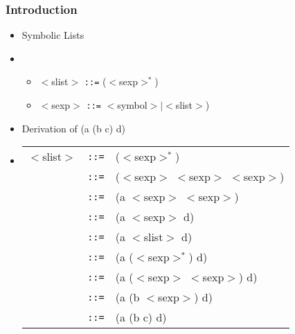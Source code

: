 \documentclass{beamer}
\newcommand{\is}{\texttt{::=}}
\begin{document}
\begin{frame}[fragile]
\frametitle{Introduction}
\begin{scriptsize}
\begin{itemize}
\item<1-> Symbolic Lists

\item<1->
\begin{itemize}
    \item $<$slist$>$ \is{} ($<$sexp$>^*$) \newline
    \item $<$sexp$>$ \is{} $<$symbol$> | <$slist$>$)
\end{itemize}

\item<2-> Derivation of (a (b c) d)

\item<2->
  \begin{tabular}{lll}
    $<$slist$>$ & \is{} & ($<$sexp$>^*$) \\
     & \is{} & ($<$sexp$>$ $<$sexp$>$ $<$sexp$>$) \\
     & \is{} & (a  $<$sexp$>$ $<$sexp$>$) \\
     & \is{} & (a $<$sexp$>$ d) \\
     & \is{} & (a $<$slist$>$ d) \\
     & \is{} & (a ($<$sexp$>^*$) d)\\
     & \is{} & (a ($<$sexp$>$ $<$sexp$>$) d)\\
     & \is{} & (a (b $<$sexp$>$) d)\\
     & \is{} & (a (b c) d)\\
  \end{tabular}
\end{itemize}
\end{scriptsize}
\end{frame}
\end{document}
